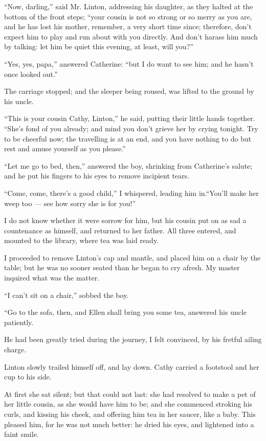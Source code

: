 \par “Now, darling,” said Mr. Linton, addressing his daughter, as they halted at the bottom of the front steps; “your cousin is not so strong or so merry as you are, and he has lost his mother, remember, a very short time since; therefore, don't expect him to play and run about with you directly. And don't harass him much by talking: let him be quiet this evening, at least, will you?”
\par “Yes, yes, papa,” answered Catherine: “but I do want to see him; and he hasn't once looked out.”
\par The carriage stopped; and the sleeper being roused, was lifted to the ground by his uncle.
\par “This is your cousin Cathy, Linton,” he said, putting their little hands together. “She's fond of you already; and mind you don't grieve her by crying tonight. Try to be cheerful now; the travelling is at an end, and you have nothing to do but rest and amuse yourself as you please.”
\par “Let me go to bed, then,” answered the boy, shrinking from Catherine's salute; and he put his fingers to his eyes to remove incipient tears.
\par “Come, come, there's a good child,” I whispered, leading him in.“You'll make her weep too — see how sorry she is for you!”
\par I do not know whether it were sorrow for him, but his cousin put on as sad a countenance as himself, and returned to her father. All three entered, and mounted to the library, where tea was laid ready.
\par I proceeded to remove Linton's cap and mantle, and placed him on a chair by the table; but he was no sooner seated than he began to cry afresh. My master inquired what was the matter.
\par “I can't sit on a chair,” sobbed the boy.
\par “Go to the sofa, then, and Ellen shall bring you some tea, answered his uncle patiently.
\par He had been greatly tried during the journey, I felt convinced, by his fretful ailing charge.
\par Linton slowly trailed himself off, and lay down. Cathy carried a footstool and her cup to his side.
\par At first she sat silent; but that could not last: she had resolved to make a pet of her little cousin, as she would have him to be; and she commenced stroking his curls, and kissing his cheek, and offering him tea in her saucer, like a baby. This pleased him, for he was not much better: he dried his eyes, and lightened into a faint smile.
